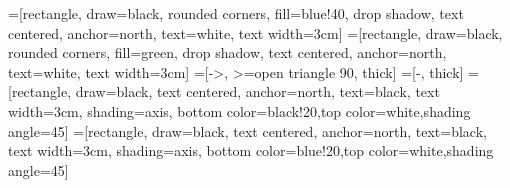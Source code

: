 \documentclass{minimal}
\begin{document}
=[rectangle, draw=black, rounded corners, fill=blue!40, drop shadow,
        text centered, anchor=north, text=white, text width=3cm]
=[rectangle, draw=black, rounded corners, fill=green, drop shadow,
        text centered, anchor=north, text=white, text width=3cm]
=[->, >=open triangle 90, thick]
=[-, thick]
=[rectangle, draw=black, text centered, anchor=north, text=black, text width=3cm, shading=axis,
    bottom color=black!20,top color=white,shading angle=45]
=[rectangle, draw=black, text centered, anchor=north, text=black, text width=3cm, shading=axis,
    bottom color=blue!20,top color=white,shading angle=45]

        
\begin{center}
\end{center}
\end{document}
